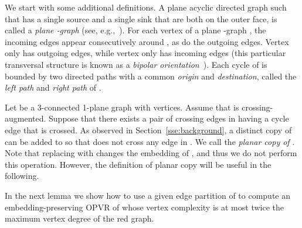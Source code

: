 \documentclass{article}
\newcommand{\opvr}{OPVR\xspace}
\begin{document}
We start with some additional definitions. A plane acyclic directed graph  such that  has a single source  and a single sink  that are both on the outer face, is called a \emph{plane -graph} (see, e.g.,~\cite{DBLP:journals/dcg/RosenstiehlT86,TamassiaTollis86}).  For each vertex  of a plane -graph , the incoming edges appear consecutively around , as do the outgoing edges. Vertex  only has outgoing edges, while vertex  only has incoming edges (this particular transversal structure is known as a \emph{bipolar orientation}~\cite{DBLP:journals/dcg/RosenstiehlT86,TamassiaTollis86}). Each cycle  of  is bounded by two directed paths with a common \emph{origin} and \emph{destination}, called the \emph{left path} and \emph{right path} of . 

Let  be a 3-connected 1-plane graph with  vertices. Assume that  is crossing-augmented. Suppose that there exists a pair of crossing edges in  having a cycle edge  that is crossed. As observed in Section~\ref{sse:background}, a distinct copy  of  can be added to  so that  does not cross any edge in . We call  the \emph{planar copy of }. Note that replacing  with  changes the embedding of , and thus we do not perform this operation. However, the definition of planar copy will be useful in the following.    

In the next lemma we show how to use a given edge partition of  to compute an embedding-preserving \opvr of  whose vertex complexity is at most twice the maximum vertex degree of the red graph. 
\end{document}
